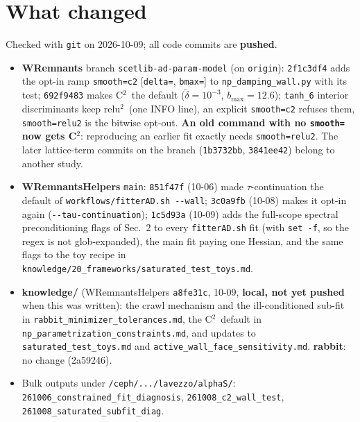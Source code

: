 \documentclass[10pt,a4paper]{article}
\newcommand\code{\nolinkurl}
\newcommand\relu{relu$^2$}
\newcommand\Ctwo{C$^2$}
\begin{document}
\section{What changed}

Checked with \code{git} on 2026-10-09; all code commits are \textbf{pushed}.
\begin{itemize}
  \item \textbf{WRemnants} branch \code{scetlib-ad-param-model} (on \code{origin}): \code{2f1c3df4} adds the opt-in ramp
    \code{smooth=c2} [\code{delta=}, \code{bmax=}] to \code{np_damping_wall.py} with its test; \code{692f9483} makes \Ctwo\
    the default ($\tilde\delta=10^{-3}$, $b_\mathrm{max}=12.6$); \code{tanh_6} interior discriminants keep \relu\ (one INFO
    line), an explicit \code{smooth=c2} refuses them, \code{smooth=relu2} is the bitwise opt-out. \textbf{An old command
    with no \code{smooth=} now gets \Ctwo}: reproducing an earlier fit exactly needs \code{smooth=relu2}. The later
    lattice-term commits on the branch (\code{1b3732bb}, \code{3841ee42}) belong to another study.
  \item \textbf{WRemnantsHelpers} \code{main}: \code{851f47f} (10-06) made $\tau$-continuation the default of
    \code{workflows/fitterAD.sh}~\code{--wall}; \code{3c0a9fb} (10-08) makes it opt-in again (\code{--tau-continuation});
    \code{1c5d93a} (10-09) adds the full-scope spectral preconditioning flags of Sec.~2 to every \code{fitterAD.sh} fit (with \code{set -f}, so the regex is not glob-expanded), the main fit paying one Hessian, and the same flags to the
    toy recipe in \code{knowledge/20_frameworks/saturated_test_toys.md}.
  \item \textbf{knowledge/} (WRemnantsHelpers \code{a8fe31c}, 10-09, \textbf{local, not yet pushed} when this was
    written): the crawl mechanism and the ill-conditioned sub-fit in \code{rabbit_minimizer_tolerances.md}, the \Ctwo\
    default in \code{np_parametrization_constraints.md}, and updates to \code{saturated_test_toys.md} and
    \code{active_wall_face_sensitivity.md}. \textbf{rabbit}: no change (2a59246).
  \item Bulk outputs under \code{/ceph/.../lavezzo/alphaS/}: \code{261006_constrained_fit_diagnosis},
    \code{261008_c2_wall_test}, \code{261008_saturated_subfit_diag}.
\end{itemize}

\end{document}
